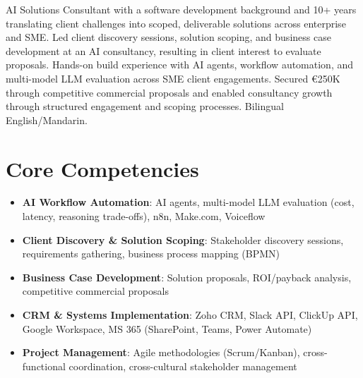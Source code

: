 \documentclass[11pt,a4paper,sans]{moderncv}
\begin{document}
\makecvtitle


\vspace{6pt}
\small{AI Solutions Consultant with a software development background and 10+ years translating client challenges into scoped, deliverable solutions across enterprise and SME. Led client discovery sessions, solution scoping, and business case development at an AI consultancy, resulting in client interest to evaluate proposals. Hands-on build experience with AI agents, workflow automation, and multi-model LLM evaluation across SME client engagements. Secured €250K through competitive commercial proposals and enabled consultancy growth through structured engagement and scoping processes. Bilingual English/Mandarin.}


\section{Core Competencies}
\vspace{1pt}
\begin{itemize}

\item \textbf{AI Workflow Automation}: AI agents, multi-model LLM evaluation (cost, latency, reasoning trade-offs), n8n, Make.com, Voiceflow

\item \textbf{Client Discovery \& Solution Scoping}: Stakeholder discovery sessions, requirements gathering, business process mapping (BPMN)

\item \textbf{Business Case Development}: Solution proposals, ROI/payback analysis, competitive commercial proposals

\item \textbf{CRM \& Systems Implementation}: Zoho CRM, Slack API, ClickUp API, Google Workspace, MS 365 (SharePoint, Teams, Power Automate)

\item \textbf{Project Management}: Agile methodologies (Scrum/Kanban), cross-functional coordination, cross-cultural stakeholder management

\end{itemize}
\end{document}
